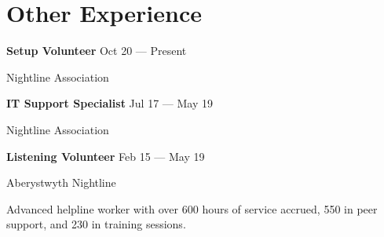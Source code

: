 \section{Other Experience}




\parbox[t][][t]{\linewidth}{
	\parbox{\linewidth}{\textbf{Setup Volunteer} \hfill {{Oct 20 --- Present}}}
	\parbox{\linewidth}{Nightline Association}
	\bigbreak
	\smallskip
}

\parbox[t][][t]{\linewidth}{
	\parbox{\linewidth}{\textbf{IT Support Specialist} \hfill {{Jul 17 --- May 19}}}
	\parbox{\linewidth}{Nightline Association}
	\bigbreak
	\smallskip
}

\parbox[t][][t]{\linewidth}{
	\parbox{\linewidth}{\textbf{Listening Volunteer} \hfill {{Feb 15 --- May 19}}}
	\parbox{\linewidth}{Aberystwyth Nightline}
	\smallbreak
	\smallskip
	Advanced helpline worker with over 600 hours of service accrued, 550 in peer support, and 230 in training sessions.
}

